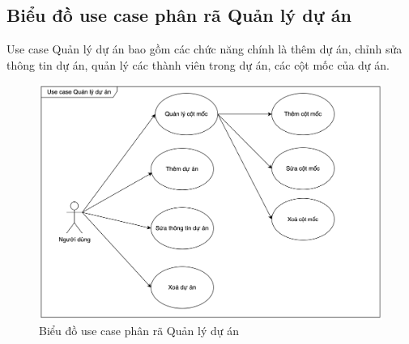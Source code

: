 \documentclass[../DoAn.tex]{subfiles}
\begin{document}
\subsection{Biểu đồ use case phân rã Quản lý dự án}
\label{subsection:2.2.4}
Use case Quản lý dự án bao gồm các chức năng chính là thêm dự án, chỉnh sửa thông tin dự án, quản lý các thành viên trong dự án,
các cột mốc của dự án.
\begin{figure}[H]
    \centering
    \includegraphics[width=1.0\linewidth]{Hinhve/ProjectUseCases.png}
    \caption{Biểu đồ use case phân rã Quản lý dự án}
    \label{fig:ProjectUseCases}
\end{figure}
\newpage

\end{document}
